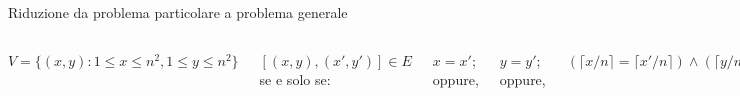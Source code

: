 \begin{frame}{Riduzione da problema particolare a problema generale}

\vspace{-12pt}
\begin{columns}[T]
\BIL
\item $V=\{ (x,y) : 1 \leq x \leq n^2, 1 \leq y \leq n^2 \}$
\item $[(x,y), (x',y')] \in E$ se e solo se:
\BI
\item $x=x'$; oppure,
\item $y=y'$; oppure,
\item $(\lceil x/n \rceil = \lceil x'/n \rceil) \wedge (\lceil y/n \rceil = \lceil y'/n \rceil)$
\EI
\item L'insieme di colori è $\{1, \ldots, n \}$.
\EIL

\vspace{-9pt}
\begin{center}
\end{center}

Se abbiamo una soluzione per la colorazione, allora abbiamo una soluzione algoritmica per il Sudoku

\bigskip
{}
\BIL
\item Assegnamento radio frequenze in un insieme di torri cellulari
\item Allocazione degli esami universitari
\EIL

\end{columns}

\end{frame}


